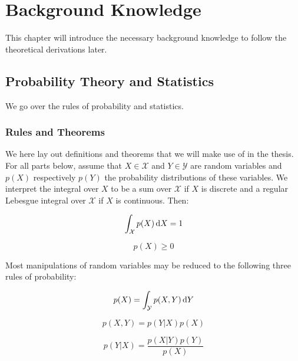 
\chapter{Background Knowledge}
\label{BackgroundKnowledgeCh}

This chapter will introduce the necessary background knowledge to follow the
theoretical derivations later.

\section{Probability Theory and Statistics}

We go over the rules of probability and statistics.

\subsection{Rules and Theorems}

We here lay out definitions and theorems that we will make use of in the thesis.
For all parts below, assume that $X \in \mathcal{X}$ and $Y \in \mathcal{Y}$ are
random variables and $p(X)$ respectively $p(Y)$ the probability distributions
of these variables. We interpret the integral over $X$ to be a sum over
$\mathcal{X}$ if $X$ is discrete and a regular Lebesgue integral over
$\mathcal{X}$ if $X$ is continuous. Then:
\begin{definition}
  \label{eq:unit_vol_prob_axiom}
  \begin{equation*}
    \int_{\mathcal{X}}p(X) \dif X = 1
  \end{equation*}
\end{definition}
\begin{definition}
  \label{eq:non_neg_of_prob}
  \begin{equation*}
    p(X) \geq 0
  \end{equation*}
\end{definition}

Most manipulations of random variables may be reduced to the following three rules of probability:
\begin{theorem}
  \label{eq:sum_rule}
  \begin{equation*}
    p(X) = \int_{\mathcal{Y}}p(X, Y) \dif Y
  \end{equation*}
\end{theorem}
\begin{theorem}
  \label{eq:product_theorem}
  \begin{equation*}
    p(X, Y) = p(Y | X)p(X)
  \end{equation*}
\end{theorem}
\begin{theorem}
  \label{eq:Bayes_theorem}
  \begin{equation*}
    p(Y | X) = \frac{p(X | Y)p(Y)}{p(X)}
  \end{equation*}
\end{theorem}

